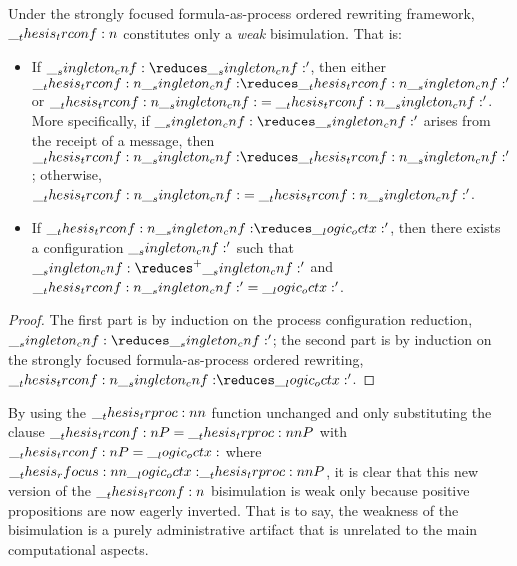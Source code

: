%
\begin{theorem}
  Under the strongly focused formula-as-process ordered rewriting framework, $\__thesis_trconf:n {}$ constitutes only a \emph{weak} bisimulation.
  That is:
  \begin{itemize}[nosep]
  \item
    If\/ $\cnf \reduces \cnf'$, then either $\trconf{\cnf} \reduces \trconf{\cnf'}$ or $\__thesis_trconf:n {\__singleton_cnf:} = \__thesis_trconf:n {\__singleton_cnf:'}$.
    More specifically, if $\cnf \reduces \cnf'$ arises from the receipt of a message, then $\trconf{\cnf} \reduces \trconf{\cnf'}$; otherwise, $\__thesis_trconf:n {\__singleton_cnf:} = \__thesis_trconf:n {\__singleton_cnf:'}$.
  \item
    If\/ $\trconf{\cnf} \reduces \octx'$, then there exists a configuration $\__singleton_cnf:'$ such that $\cnf \reduces^{+} \cnf'$ and $\__thesis_trconf:n {\__singleton_cnf:'} = \__logic_octx:'$.
  \end{itemize}
\end{theorem}
\begin{proof}
  The first part is by induction on the process configuration reduction, $\cnf \reduces \cnf'$; the second part is by induction on the strongly focused formula-as-process ordered rewriting, $\trconf{\cnf} \reduces \octx'$.
\end{proof}

By using the $\trproc{}$ function unchanged and only substituting the clause $\trconf{P} = \trproc{P}$ with $\__thesis_trconf:n {P} = \__logic_octx:$ where $\rfocus{\octx}{\trproc{P}}$, it is clear that this new version of the $\__thesis_trconf:n {}$ bisimulation is weak only because positive propositions are now eagerly inverted.
That is to say, the weakness of the bisimulation is a purely administrative artifact that is unrelated to the main computational aspects.






